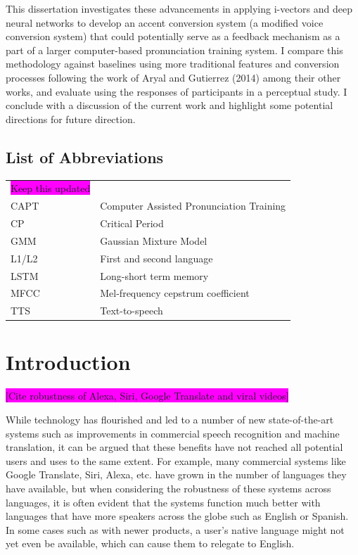 \documentclass
[
    a4paper,
    twoside,
    12pt,
]
{report}
\begin{document}
This dissertation investigates these advancements in applying i-vectors
and deep neural networks to develop an accent conversion system (a
modified voice conversion system) that could potentially serve as a
feedback mechanism as a part of a larger computer-based pronunciation
training system. I compare this methodology against baselines using more
traditional features and conversion processes following the work of
Aryal and Gutierrez (2014) among their other works, and evaluate using
the responses of participants in a perceptual study. I conclude with a
discussion of the current work and highlight some potential directions
for future direction.
\cleardoublepage
\tableofcontents
{}
\clearpage
\listoffigures
{}

\section*{List of Abbreviations}
\begin{tabular}{ll}
    \colorbox{magenta}{Keep this updated} \\
    CAPT    & Computer Assisted Pronunciation Training \\
    CP      & Critical Period \\
    GMM     & Gaussian Mixture Model \\
    L1/L2    & First and second language \\
    LSTM & Long-short term memory \\
    MFCC & Mel-frequency cepstrum coefficient \\ 
    TTS   & Text-to-speech \\
    
\end{tabular}

\clearpage
\cleardoublepage
{}
\setcounter{page}{1}

\chapter{Introduction}

\colorbox{magenta}{[Cite robustness of Alexa, Siri, Google Translate and viral videos]}

While technology has flourished and led to a number of new
state-of-the-art systems such as improvements in commercial speech
recognition and machine translation, it can be argued that these
benefits have not reached all potential users and uses to the same
extent. For example, many commercial systems like Google Translate,
Siri, Alexa, etc. have grown in the number of languages they have
available, but when considering the robustness of these systems across
languages, it is often evident that the systems function much better
with languages that have more speakers across the globe such as English
or Spanish. In some cases such as with newer products, a user's native
language might not yet even be available, which can cause them to
relegate to English.
\end{document}
